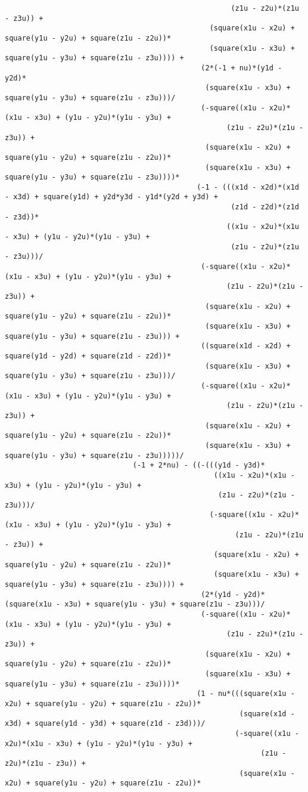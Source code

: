 \begin{lstlisting}
													 (z1u - z2u)*(z1u - z3u)) + 
												(square(x1u - x2u) + square(y1u - y2u) + square(z1u - z2u))*
												(square(x1u - x3u) + square(y1u - y3u) + square(z1u - z3u)))) + 
											  (2*(-1 + nu)*(y1d - y2d)*
											   (square(x1u - x3u) + square(y1u - y3u) + square(z1u - z3u)))/
											  (-square((x1u - x2u)*(x1u - x3u) + (y1u - y2u)*(y1u - y3u) + 
													(z1u - z2u)*(z1u - z3u)) + 
											   (square(x1u - x2u) + square(y1u - y2u) + square(z1u - z2u))*
											   (square(x1u - x3u) + square(y1u - y3u) + square(z1u - z3u))))*
											 (-1 - (((x1d - x2d)*(x1d - x3d) + square(y1d) + y2d*y3d - y1d*(y2d + y3d) + 
													 (z1d - z2d)*(z1d - z3d))*
													((x1u - x2u)*(x1u - x3u) + (y1u - y2u)*(y1u - y3u) + 
													 (z1u - z2u)*(z1u - z3u)))/
											  (-square((x1u - x2u)*(x1u - x3u) + (y1u - y2u)*(y1u - y3u) + 
													(z1u - z2u)*(z1u - z3u)) + 
											   (square(x1u - x2u) + square(y1u - y2u) + square(z1u - z2u))*
											   (square(x1u - x3u) + square(y1u - y3u) + square(z1u - z3u))) + 
											  ((square(x1d - x2d) + square(y1d - y2d) + square(z1d - z2d))*
											   (square(x1u - x3u) + square(y1u - y3u) + square(z1u - z3u)))/
											  (-square((x1u - x2u)*(x1u - x3u) + (y1u - y2u)*(y1u - y3u) + 
													(z1u - z2u)*(z1u - z3u)) + 
											   (square(x1u - x2u) + square(y1u - y2u) + square(z1u - z2u))*
											   (square(x1u - x3u) + square(y1u - y3u) + square(z1u - z3u)))))/
							  (-1 + 2*nu) - ((-(((y1d - y3d)*
												 ((x1u - x2u)*(x1u - x3u) + (y1u - y2u)*(y1u - y3u) + 
												  (z1u - z2u)*(z1u - z3u)))/
												(-square((x1u - x2u)*(x1u - x3u) + (y1u - y2u)*(y1u - y3u) + 
													  (z1u - z2u)*(z1u - z3u)) + 
												 (square(x1u - x2u) + square(y1u - y2u) + square(z1u - z2u))*
												 (square(x1u - x3u) + square(y1u - y3u) + square(z1u - z3u)))) + 
											  (2*(y1d - y2d)*(square(x1u - x3u) + square(y1u - y3u) + square(z1u - z3u)))/
											  (-square((x1u - x2u)*(x1u - x3u) + (y1u - y2u)*(y1u - y3u) + 
													(z1u - z2u)*(z1u - z3u)) + 
											   (square(x1u - x2u) + square(y1u - y2u) + square(z1u - z2u))*
											   (square(x1u - x3u) + square(y1u - y3u) + square(z1u - z3u))))*
											 (1 - nu*(((square(x1u - x2u) + square(y1u - y2u) + square(z1u - z2u))*
													   (square(x1d - x3d) + square(y1d - y3d) + square(z1d - z3d)))/
													  (-square((x1u - x2u)*(x1u - x3u) + (y1u - y2u)*(y1u - y3u) + 
															(z1u - z2u)*(z1u - z3u)) + 
													   (square(x1u - x2u) + square(y1u - y2u) + square(z1u - z2u))*

\end{lstlisting}
